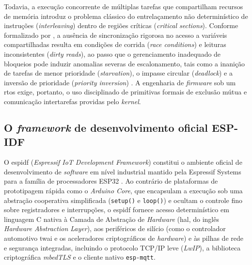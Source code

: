 \documentclass[
	12pt,				%
	openright,			%
	twoside,			%
	a4paper,			%
	english,			%
	brazil				%
	]{abntex2}
\begin{document}
Todavia, a execução concorrente de múltiplas tarefas que compartilham recursos de
memória introduz o problema clássico do entrelaçamento não determinístico de instruções
(\textit{interleaving}) dentro de regiões críticas (\textit{critical sections}).
Conforme formalizado por , a ausência de sincronização rigorosa
no acesso a variáveis compartilhadas resulta em condições de corrida
(\textit{race conditions}) e leituras inconsistentes (\textit{dirty reads}), ao passo
que o gerenciamento inadequado de bloqueios pode induzir anomalias severas de
escalonamento, tais como a inanição de tarefas de menor prioridade
(\textit{starvation}), o impasse circular (\textit{deadlock}) e a inversão de prioridade
(\textit{priority inversion}) \cite{tanenbaum2006}. A engenharia de \textit{firmware}
sob um \acrshort{rtos} exige, portanto, o uso disciplinado de primitivas formais de
exclusão mútua e comunicação intertarefas providas pelo \textit{kernel}.

\subsection{O \textit{framework} de desenvolvimento oficial ESP-IDF}\label{sec:espidf}

O \acrshort{espidf} (\textit{Espressif IoT Development Framework}) constitui o ambiente
oficial de desenvolvimento de \textit{software} em nível industrial mantido pela
Espressif Systems para a família de processadores ESP32 \cite{espressif2026}. Ao
contrário de plataformas de prototipagem rápida como o \textit{Arduino Core}, que
encapsulam a execução sob uma abstração cooperativa simplificada (\texttt{setup()} e
\texttt{loop()}) e ocultam o controle fino sobre registradores e interrupções, o
\acrshort{espidf} fornece acesso determinístico em linguagem C nativa à Camada de
Abstração de \textit{Hardware} (\acrshort{hal}, do inglês
\textit{Hardware Abstraction Layer}), aos periféricos de silício (como o controlador
automotivo \acrshort{twai} e os aceleradores criptográficos de \textit{hardware}) e às
pilhas de rede e segurança integradas, incluindo o protocolo TCP/IP leve
(\textit{LwIP}), a biblioteca criptográfica \textit{mbedTLS} e o cliente nativo
\texttt{esp-mqtt}.
\end{document}
